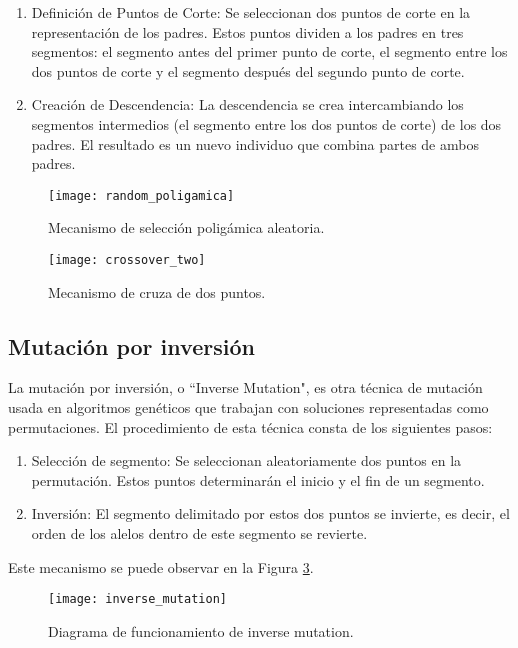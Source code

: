 \begin{enumerate}
	\item Definición de Puntos de Corte: Se seleccionan dos puntos de corte en la representación de los padres. Estos puntos dividen a los padres en tres segmentos: el segmento antes del primer punto de corte, el segmento entre los dos puntos de corte y el segmento después del segundo punto de corte.
	\item Creación de Descendencia: La descendencia se crea intercambiando los segmentos intermedios (el segmento entre los dos puntos de corte) de los dos padres. El resultado es un nuevo individuo que combina partes de ambos padres.
\end{enumerate}

\begin{figure}[htbp]
	\centering
	\texttt{[image: random\_poligamica]}
	\caption{Mecanismo de selección poligámica aleatoria.}
	\label{fig: selection_poli}
\end{figure}


\begin{figure}[htbp]
	\centering
	\texttt{[image: crossover\_two]}
	\caption{Mecanismo de cruza de dos puntos.}
	\label{fig: cross_two}
\end{figure}

\newpage
\subsection{Mutación por inversión}
La mutación por inversión, o ``Inverse Mutation", es otra técnica de mutación usada en algoritmos genéticos que trabajan con soluciones representadas como permutaciones. El procedimiento de esta técnica consta de los siguientes pasos:

\begin{enumerate}
	\item Selección de segmento: Se seleccionan aleatoriamente dos puntos en la permutación. Estos puntos determinarán el inicio y el fin de un segmento.
	\item Inversión: El segmento delimitado por estos dos puntos se invierte, es decir, el orden de los alelos dentro de este segmento se revierte.
\end{enumerate}

Este mecanismo se puede observar en la Figura \ref{fig:InvM}.

\begin{figure}[htbp]
	\centering
	\texttt{[image: inverse\_mutation]}
	\caption{Diagrama de funcionamiento de inverse mutation.}
	\label{fig:InvM}
\end{figure}


